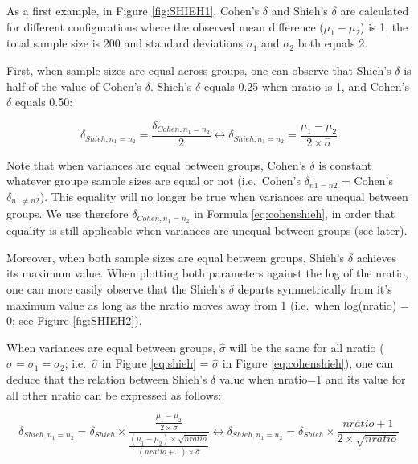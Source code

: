 \documentclass[man]{apa6}
\begin{document}
As a first example, in Figure \ref{fig:SHIEH1}, Cohen's \(\delta\) and Shieh's \(\delta\) are calculated for different configurations where the observed mean difference (\(\mu_{1}-\mu_{2}\)) is 1, the total sample size is 200 and standard deviations \(\sigma_{1}\) and \(\sigma_{2}\) both equals 2.

First, when sample sizes are equal across groups, one can observe that Shieh's \(\delta\) is half of the value of Cohen's \(\delta\). Shieh's \(\delta\) equals 0.25 when nratio is 1, and Cohen's \(\delta\) equals 0.50:

\begin{equation} 
\delta_{Shieh,n_1=n_2} = \frac{\delta_{Cohen,n_1=n_2}}{2}
\leftrightarrow \delta_{Shieh,n_1=n_2}= \frac{\mu_1-\mu_2}{2 \times \hat{\sigma}} 
\label{eq:cohenshieh}
\end{equation}

Note that when variances are equal between groups, Cohen's \(\delta\) is constant whatever groupe sample sizes are equal or not (i.e.~Cohen's \(\delta_{n1=n2}\) = Cohen's \(\delta_{n1 \neq n2}\)). This equality will no longer be true when variances are unequal between groups. We use therefore \(\delta_{Cohen, n_1=n_2}\) in Formula \ref{eq:cohenshieh}, in order that equality is still applicable when variances are unequal between groups (see later).

Moreover, when both sample sizes are equal between groups, Shieh's \(\delta\) achieves its maximum value. When plotting both parameters against the log of the nratio, one can more easily observe that the Shieh's \(\delta\) departs symmetrically from it's maximum value as long as the nratio moves away from 1 (i.e.~when log(nratio) = 0; see Figure \ref{fig:SHIEH2}).

When variances are equal between groups, \(\hat{\sigma}\) will be the same for all nratio (\(\hat{\sigma}=\sigma_1=\sigma_2\); i.e.~\(\hat{\sigma}\) in Figure \ref{eq:shieh} = \(\hat{\sigma}\) in Figure \ref{eq:cohenshieh}), one can deduce that the relation between Shieh's \(\delta\) value when nratio=1 and its value for all other nratio can be expressed as follows:

\begin{equation} 
\delta_{Shieh,n_1=n_2}= \delta_{Shieh} \times \frac{\frac{\mu_1-\mu_2}{2 \times \hat{\sigma}}}{\frac{(\mu_1-\mu_2) \times \sqrt{nratio}}{(nratio+1) \times \hat{\sigma}}}
\leftrightarrow \delta_{Shieh,n_1=n_2}= \delta_{Shieh} \times \frac{nratio+1}{2 \times \sqrt{nratio}}
\label{eq:shiehvsmax}
\end{equation}
\end{document}
